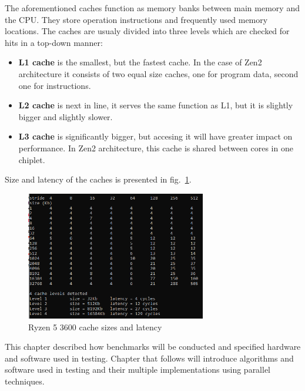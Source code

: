 The aforementioned caches function as memory banks between main memory and the CPU. They store operation instructions and frequently used memory locations. The caches are usualy divided into three levels which are checked for hits in a top-down manner:
\begin{itemize}
	\item \textbf{L1 cache} is the smallest, but the fastest cache. In the case of Zen2 architecture it consists of two equal size caches, one for program data, second one for instructions. 
	\item \textbf{L2 cache} is next in line, it serves the same function as L1, but it is slightly bigger and slightly slower.
	\item \textbf{L3 cache} is significantly bigger, but accesing it will have greater impact on performance. In Zen2 architecture, this cache is shared between cores in one chiplet.  
\end{itemize}

Size and latency of the caches is presented in fig.~\ref{fig:Cache}.

\begin{figure}[!ht]
	\centering
		\includegraphics[width = 0.7\textwidth]{figures03/Cache.PNG}
	\caption{Ryzen 5 3600 cache sizes and latency}
	\label{fig:Cache}
\end{figure}

This chapter described how benchmarks will be conducted and specified hardware and software used in testing. Chapter that follows will introduce algorithms and software used in testing and their multiple implementations using parallel techniques. 
